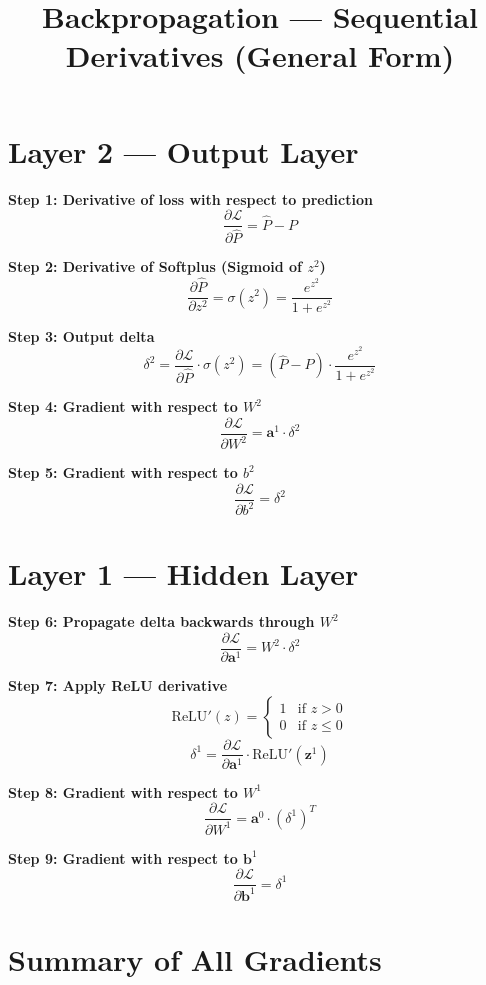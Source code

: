 \documentclass{article}
\title{Backpropagation --- Sequential Derivatives (General Form)}
\author{}
\date{}
\begin{document}
\maketitle

\section*{Layer 2 --- Output Layer}

\textbf{Step 1: Derivative of loss with respect to prediction}
\[
\frac{\partial \mathcal{L}}{\partial \hat{P}} = \hat{P} - P
\]

\textbf{Step 2: Derivative of Softplus (Sigmoid of $z^2$)}
\[
\frac{\partial \hat{P}}{\partial z^2} = \sigma(z^2) = \frac{e^{z^2}}{1 + e^{z^2}}
\]

\textbf{Step 3: Output delta}
\[
\delta^2 = \frac{\partial \mathcal{L}}{\partial \hat{P}} \cdot \sigma(z^2) = (\hat{P} - P) \cdot \frac{e^{z^2}}{1 + e^{z^2}}
\]

\textbf{Step 4: Gradient with respect to $W^2$}
\[
\frac{\partial \mathcal{L}}{\partial W^2} = \mathbf{a}^1 \cdot \delta^2
\]

\textbf{Step 5: Gradient with respect to $b^2$}
\[
\frac{\partial \mathcal{L}}{\partial b^2} = \delta^2
\]

\section*{Layer 1 --- Hidden Layer}

\textbf{Step 6: Propagate delta backwards through $W^2$}
\[
\frac{\partial \mathcal{L}}{\partial \mathbf{a}^1} = W^2 \cdot \delta^2
\]

\textbf{Step 7: Apply ReLU derivative}
\[
\text{ReLU}'(z) =
\begin{cases}
1 & \text{if } z > 0 \\
0 & \text{if } z \leq 0
\end{cases}
\]
\[
\delta^1 = \frac{\partial \mathcal{L}}{\partial \mathbf{a}^1} \cdot \text{ReLU}'(\mathbf{z}^1)
\]

\textbf{Step 8: Gradient with respect to $W^1$}
\[
\frac{\partial \mathcal{L}}{\partial W^1} = \mathbf{a}^0 \cdot (\delta^1)^T
\]

\textbf{Step 9: Gradient with respect to $\mathbf{b}^1$}
\[
\frac{\partial \mathcal{L}}{\partial \mathbf{b}^1} = \delta^1
\]

\section*{Summary of All Gradients}
\end{document}
